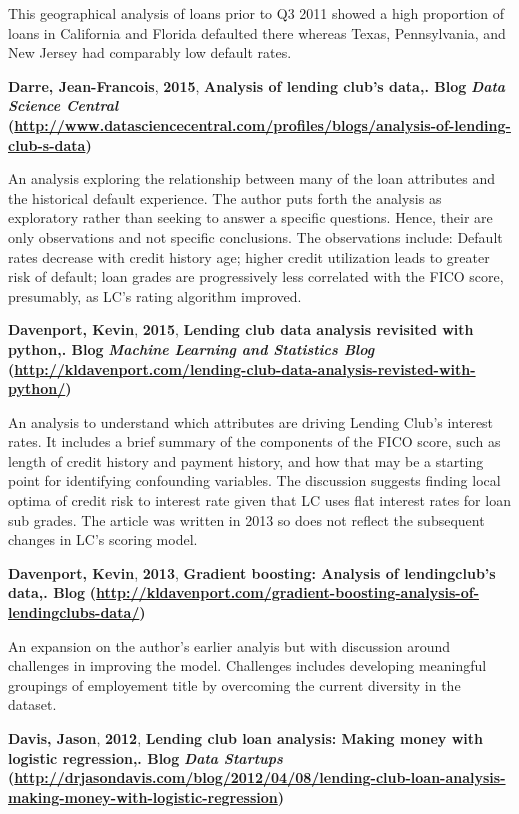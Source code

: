 \documentclass[conference,final,]{IEEEtran}
\begin{document}
This geographical analysis of loans prior to Q3 2011 showed a high
proportion of loans in California and Florida defaulted there whereas
Texas, Pennsylvania, and New Jersey had comparably low default rates.

\textbf{Darre, Jean-Francois}, \textbf{2015}, \textbf{Analysis of
lending club's data,}\textbf{. Blog} \textbf{\emph{Data Science
Central}}\textbf{
(\url{http://www.datasciencecentral.com/profiles/blogs/analysis-of-lending-club-s-data})}

An analysis exploring the relationship between many of the loan
attributes and the historical default experience. The author puts forth
the analysis as exploratory rather than seeking to answer a specific
questions. Hence, their are only observations and not specific
conclusions. The observations include: Default rates decrease with
credit history age; higher credit utilization leads to greater risk of
default; loan grades are progressively less correlated with the FICO
score, presumably, as LC's rating algorithm improved.

\textbf{Davenport, Kevin}, \textbf{2015}, \textbf{Lending club data
analysis revisited with python,}\textbf{. Blog} \textbf{\emph{Machine
Learning and Statistics Blog}}\textbf{
(\url{http://kldavenport.com/lending-club-data-analysis-revisted-with-python/})}

An analysis to understand which attributes are driving Lending Club's
interest rates. It includes a brief summary of the components of the
FICO score, such as length of credit history and payment history, and
how that may be a starting point for identifying confounding variables.
The discussion suggests finding local optima of credit risk to interest
rate given that LC uses flat interest rates for loan sub grades. The
article was written in 2013 so does not reflect the subsequent changes
in LC's scoring model.

\textbf{Davenport, Kevin}, \textbf{2013}, \textbf{Gradient boosting:
Analysis of lendingclub's data,}\textbf{. Blog}\textbf{
(\url{http://kldavenport.com/gradient-boosting-analysis-of-lendingclubs-data/})}

An expansion on the author's earlier analyis but with discussion around
challenges in improving the model. Challenges includes developing
meaningful groupings of employement title by overcoming the current
diversity in the dataset.

\textbf{Davis, Jason}, \textbf{2012}, \textbf{Lending club loan
analysis: Making money with logistic regression,}\textbf{. Blog}
\textbf{\emph{Data Startups}}\textbf{
(\url{http://drjasondavis.com/blog/2012/04/08/lending-club-loan-analysis-making-money-with-logistic-regression})}
\end{document}
